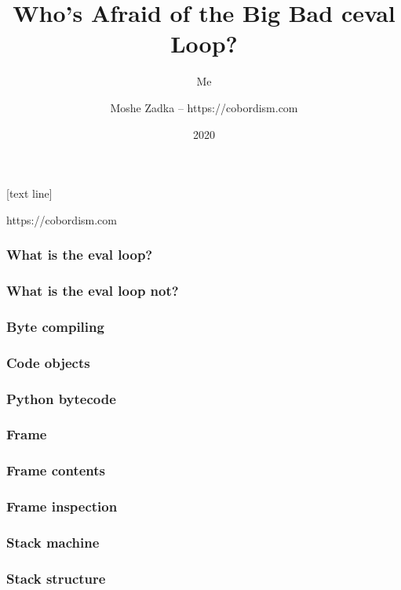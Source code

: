 \usepackage{hyperref}
\usepackage{graphicx}
\usepackage{listings}
\usepackage{textcomp}
\usepackage{fancyvrb}

[text line]{%
  \parbox{\linewidth}{\vspace*{-64pt}https://cobordism.com}}

\title{Who's Afraid of the Big Bad ceval Loop?}
\subtitle{Me}
\author{Moshe Zadka -- https://cobordism.com}
\date{2020}


\begin{titlepage}
\maketitle
\end{titlepage}

\frame{\titlepage}

\begin{frame}
\frametitle{What is the eval loop?}
\end{frame}

\begin{frame}
\frametitle{What is the eval loop not?}
\end{frame}

\begin{frame}
\frametitle{Byte compiling}
\end{frame}

\begin{frame}
\frametitle{Code objects}
\end{frame}

\begin{frame}
\frametitle{Python bytecode}
\end{frame}

\begin{frame}
\frametitle{Frame}
\end{frame}

\begin{frame}
\frametitle{Frame contents}
\end{frame}

\begin{frame}
\frametitle{Frame inspection}
\end{frame}

\begin{frame}
\frametitle{Stack machine}
\end{frame}

\begin{frame}
\frametitle{Stack structure}
\end{frame}

